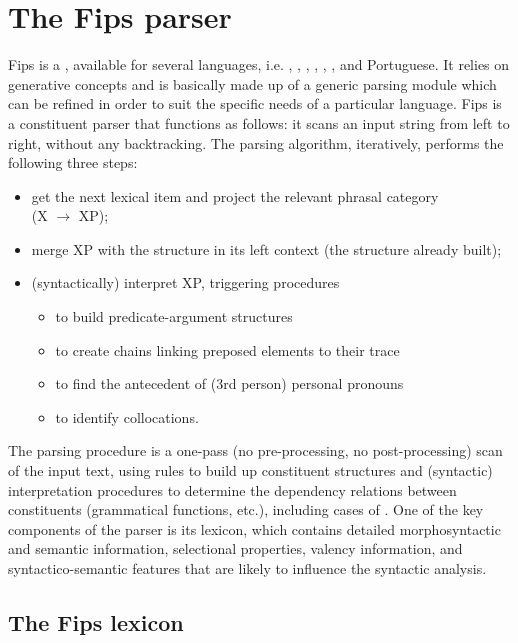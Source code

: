 \documentclass[output=paper]{langsci/langscibook}
\begin{document}
\section{The Fips parser}
\label{fou:sec3}
Fips is a , available for several languages, i.e. , , , , , ,  and Portuguese. It relies on generative  concepts and is basically made up of a generic parsing module which can be refined in order to suit the specific needs of a particular language. Fips is a constituent parser that functions as follows: it scans an input string from left to right, without any backtracking. The parsing algorithm, iteratively, performs the following three steps:
\begin{itemize}
\item get the next lexical item and project the relevant phrasal category\\ (X $\rightarrow$ XP);
\item merge XP with the structure in its left context (the structure already built);
\item (syntactically) interpret XP, triggering procedures 
	\begin{itemize}
		\item to build predicate-argument structures
		\item to create  chains linking preposed elements to their trace
		\item to find the antecedent of (3rd person) personal pronouns
		\item to identify collocations. 
	\end{itemize}
\end{itemize}
 
The parsing procedure is a one-pass (no pre-processing, no post-processing) scan of the input text, using rules to build up constituent structures and (syntactic) interpretation procedures to determine the dependency relations between constituents (grammatical functions, etc.), including cases of .
One of the key components of the parser is its lexicon, which contains detailed morphosyntactic and semantic information, selectional properties, valency information, and syntactico-semantic features that are likely to influence the syntactic analysis. 

\subsection{The Fips lexicon}
\end{document}
